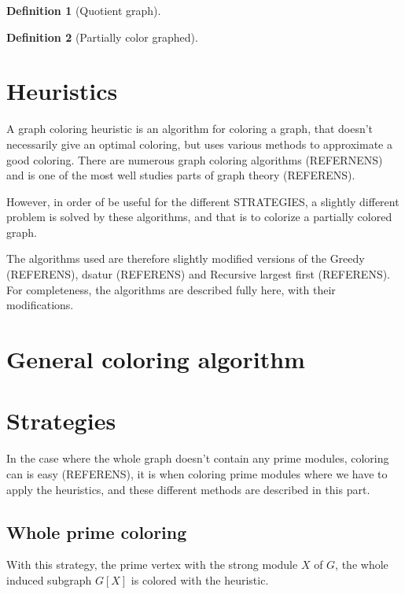 \documentclass{amsart}
\theoremstyle{definition}
\newtheorem{definition}{Definition}
\begin{document}
\begin{definition}[Quotient graph]

\end{definition}

\begin{definition}[Partially color graphed]


\end{definition}

\section{Heuristics}

A graph coloring heuristic is an algorithm for coloring a graph, that doesn't
necessarily give an optimal coloring, but uses various methods to approximate a
good coloring. There are numerous graph coloring algorithms (REFERNENS) and is
one of the most well studies parts of graph theory (REFERENS). 

However, in order of be useful for the different STRATEGIES, a slightly
different problem is solved by these algorithms, and that is to colorize a
partially colored graph.

The algorithms used are therefore slightly modified versions of the 
Greedy (REFERENS), dsatur (REFERENS) and Recursive largest first (REFERENS). For
completeness, the algorithms are described fully here, with their modifications.

\section{General coloring algorithm}



\section{Strategies}


In the case where the whole graph doesn't contain any prime modules, coloring
can is easy (REFERENS), it is when coloring prime modules where we have to apply
the heuristics, and these different methods are described in this part.


\subsection{Whole prime coloring}

With this strategy, the prime vertex with the strong module $X$ of $G$, the
whole induced subgraph $G[X]$ is colored with the heuristic.
\end{document}
